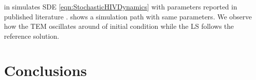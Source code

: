 \documentclass[sort&compress, preprint]{elsarticle}
\theoremstyle{definition}
\theoremstyle{plain}%
\theoremstyle{remark}
\newcommand{\SM}{LS\xspace}
\begin{document}
\citeauthor{Dalal2008} in \cite{Dalal2008} simulates SDE \eqref{eqn:StochasticHIVDynamics} with parameters reported 
	in published literature \cite{Bonhoeffer1997, Callaway2002, Nelson2000, Nowak1997}.
	 shows a simulation path with same parameters. We observe how the TEM  
	oscillates around of initial condition while the \SM follows the reference solution.  


\section{Conclusions} 




	\pagebreak
	\section*{\refname}
		
\end{document}
